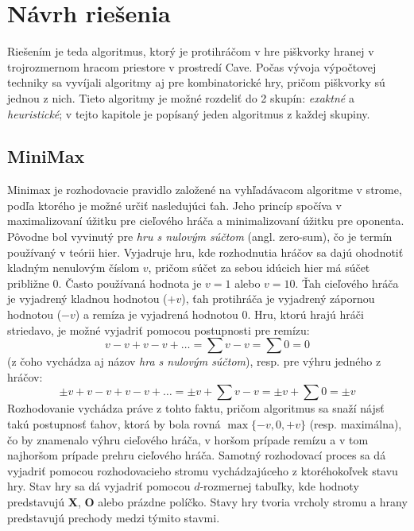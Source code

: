 \section{Návrh riešenia}\label{sec:algorithms}
Riešením je teda algoritmus, ktorý je protihráčom v hre piškvorky hranej v trojrozmernom hracom priestore v prostredí
Cave.
Počas vývoja výpočtovej techniky sa vyvíjali algoritmy aj pre kombinatorické hry, pričom piškvorky sú jednou z nich.
Tieto algoritmy je možné rozdeliť do 2 skupín: \emph{exaktné} a \emph{heuristické}; v tejto kapitole je popísaný jeden
algoritmus z každej skupiny.

\subsection{MiniMax}\label{subsec:algo-minmax}

Minimax je rozhodovacie pravidlo založené na vyhľadávacom algoritme v strome, podľa ktorého je možné určiť nasledujúci
ťah.\cite{algo_minimax}
Jeho princíp spočíva v maximalizovaní úžitku pre cieľového hráča a minimalizovaní úžitku pre oponenta.
Pôvodne bol vyvinutý pre \emph{hru s nulovým súčtom} (angl. zero-sum), čo je termín používaný v teórii hier.
Vyjadruje hru, kde rozhodnutia hráčov sa dajú ohodnotiť kladným nenulovým číslom $v$, pričom súčet za sebou idúcich hier
má súčet približne 0.
Často používaná hodnota je $v=1$ alebo $v=10$.
Ťah cieľového hráča je vyjadrený kladnou hodnotou ($+v$), ťah protihráča je vyjadrený zápornou hodnotou ($-v$) a remíza
je vyjadrená hodnotou $0$.
Hru, ktorú hrajú hráči striedavo, je možné vyjadriť pomocou postupnosti pre remízu:
\begin{equation}
    v-v+v-v+ \dots = \sum{v-v} = \sum{0} = 0
\end{equation}
(z čoho vychádza aj názov \emph{hra s nulovým súčtom}), resp. pre výhru jedného z hráčov:
\begin{equation}
    \pm v+v-v+v-v+ \dots = \pm v+\sum{v-v} = \pm v+\sum{0} = \pm v
\end{equation}
Rozhodovanie vychádza práve z tohto faktu, pričom algoritmus sa snaží nájsť takú postupnosť ťahov, ktorá by bola rovná
$\max\{-v, 0, +v\}$ (resp. maximálna), čo by znamenalo výhru cieľového hráča, v horšom prípade remízu a v tom najhoršom
prípade prehru cieľového hráča.
Samotný rozhodovací proces sa dá vyjadriť pomocou rozhodovacieho stromu vychádzajúceho z ktoréhokoľvek stavu hry.
Stav hry sa dá vyjadriť pomocou $d$-rozmernej tabuľky, kde hodnoty predstavujú \textbf{X}, \textbf{O} alebo prázdne
políčko.
Stavy hry tvoria vrcholy stromu a hrany predstavujú prechody medzi týmito stavmi.

